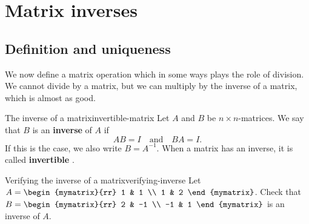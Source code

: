 \section{Matrix inverses}

\subsection{Definition and uniqueness}

We now define a matrix operation which in some ways plays the role
of division. We cannot divide by a matrix, but we can multiply by the
inverse of a matrix, which is almost as good.

\begin{definition}{The inverse of a matrix}{invertible-matrix}
  Let $A$ and $B$ be $n\times n$-matrices. We say that $B$ is an
  \textbf{inverse}%
   of $A$ if
  \begin{equation*}
    AB=I\quad\mbox{and}\quad
    BA=I.
  \end{equation*}
  If this is the case, we also write $B=A^{-1}$. When a matrix has an
  inverse, it is called \textbf{invertible}%
  .
\end{definition}

\begin{example}{Verifying the inverse of a matrix}{verifying-inverse}
  Let $A=\begin{mymatrix}{rr}
    1 & 1 \\
    1 & 2
  \end{mymatrix}$. Check that $B=\begin{mymatrix}{rr}
    2 & -1 \\
    -1 & 1
  \end{mymatrix}$ is an inverse of $A$.
\end{example}


